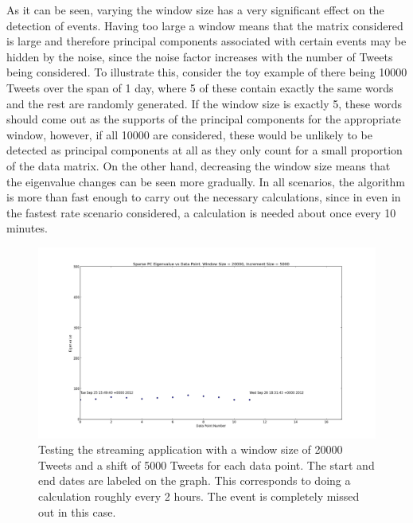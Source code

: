 \documentclass[11pt,a4paper]{article}
\begin{document}
As it can be seen, varying the window size has a very significant effect on the detection of events. Having too large a window means that the matrix considered is large and therefore principal components associated with certain events may be hidden by the noise, since the noise factor increases with the number of Tweets being considered. To illustrate this, consider the toy example of there being 10000 Tweets over the span of 1 day, where 5 of these contain exactly the same words and the rest are randomly generated. If the window size is exactly 5, these words should come out as the supports of the principal components for the appropriate window, however, if all 10000 are considered, these would be unlikely to be detected as principal components at all as they only count for a small proportion of the data matrix. On the other hand, decreasing  the window size means that the eigenvalue changes can be seen more gradually. In all scenarios, the algorithm is more than fast enough to carry out the necessary calculations, since in even in the fastest rate scenario considered, a calculation is needed about once every 10 minutes. 

\begin{figure}[H]
\centering
\includegraphics[scale=0.25]{Testing_Streaming_App_20000_5000.png}
\caption{Testing the streaming application with a window size of 20000 Tweets and a shift of 5000 Tweets for each data point. The start and end dates are labeled on the graph. This corresponds to doing a calculation roughly every 2 hours. The event is completely missed out in this case.}
\label{testing_app_20000}
\end{figure}
\end{document}

